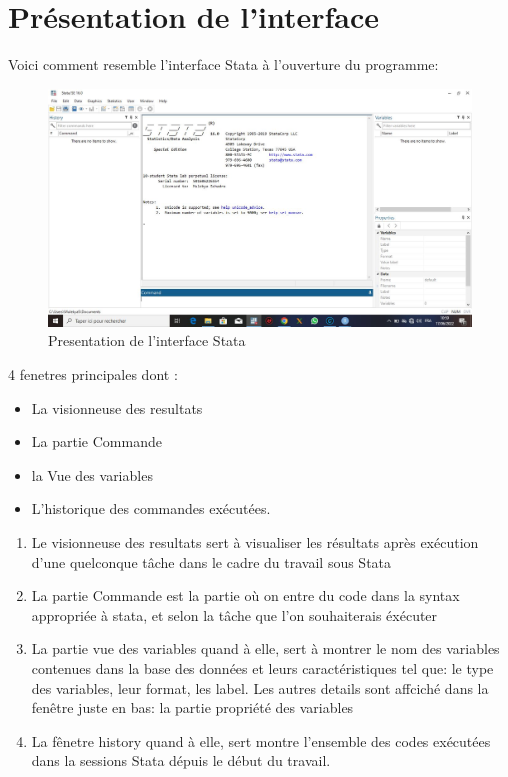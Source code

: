 \documentclass[
]{book}
\providecommand{\tightlist}{%
  \setlength{\itemsep}{0pt}\setlength{\parskip}{0pt}}
\begin{document}
\hypertarget{pruxe9sentation-de-linterface}{%
\section{Présentation de l'interface}\label{pruxe9sentation-de-linterface}}

Voici comment resemble l'interface Stata à l'ouverture du programme:

\begin{figure}
\centering
\includegraphics{"fenetre Stata.jpg"}
\caption{Presentation de l'interface Stata}
\end{figure}

4 fenetres principales dont :

\begin{itemize}
\tightlist
\item
  La visionneuse des resultats
\item
  La partie Commande
\item
  la Vue des variables
\item
  L'historique des commandes exécutées.
\end{itemize}

\begin{enumerate}
\def\labelenumi{(\arabic{enumi})}
\tightlist
\item
  Le visionneuse des resultats sert à visualiser les résultats après exécution d'une quelconque tâche dans le cadre du travail sous Stata
\item
  La partie Commande est la partie où on entre du code dans la syntax appropriée à stata, et selon la tâche que l'on souhaiterais éxécuter
\item
  La partie vue des variables quand à elle, sert à montrer le nom des variables contenues dans la base des données et leurs caractéristiques tel que: le type des variables, leur format, les label. Les autres details sont affciché dans la fenêtre juste en bas: la partie propriété des variables
\item
  La fênetre history quand à elle, sert montre l'ensemble des codes exécutées dans la sessions Stata dépuis le début du travail.
\end{enumerate}
\end{document}
